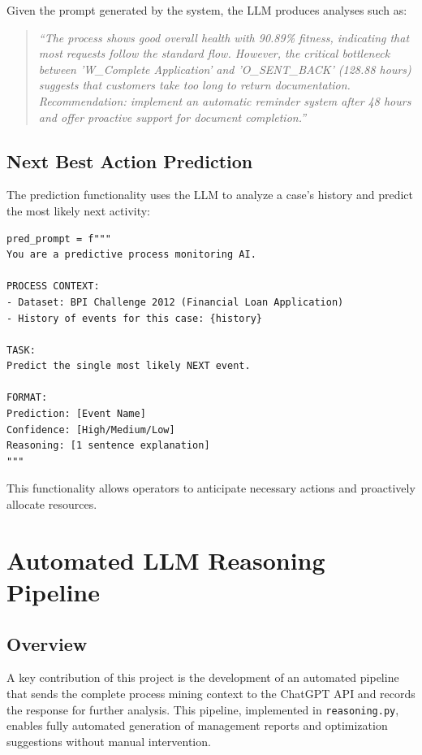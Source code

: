 \documentclass[a4paper,twoside,12pt]{article}
\begin{document}
Given the prompt generated by the system, the LLM produces analyses such as:

\begin{quote}
\textit{``The process shows good overall health with 90.89\% fitness, indicating that most requests follow the standard flow. However, the critical bottleneck between 'W\_Complete Application' and 'O\_SENT\_BACK' (128.88 hours) suggests that customers take too long to return documentation. Recommendation: implement an automatic reminder system after 48 hours and offer proactive support for document completion.''}
\end{quote}

\subsection{Next Best Action Prediction}

The prediction functionality uses the LLM to analyze a case's history and predict the most likely next activity:

\begin{lstlisting}[caption={Prompt for Next Best Action}]
pred_prompt = f"""
You are a predictive process monitoring AI.

PROCESS CONTEXT:
- Dataset: BPI Challenge 2012 (Financial Loan Application)
- History of events for this case: {history}

TASK:
Predict the single most likely NEXT event.

FORMAT:
Prediction: [Event Name]
Confidence: [High/Medium/Low]
Reasoning: [1 sentence explanation]
"""
\end{lstlisting}

This functionality allows operators to anticipate necessary actions and proactively allocate resources.

\section{Automated LLM Reasoning Pipeline}

\subsection{Overview}

A key contribution of this project is the development of an automated pipeline that sends the complete process mining context to the ChatGPT API and records the response for further analysis. This pipeline, implemented in \texttt{reasoning.py}, enables fully automated generation of management reports and optimization suggestions without manual intervention.
\end{document}
